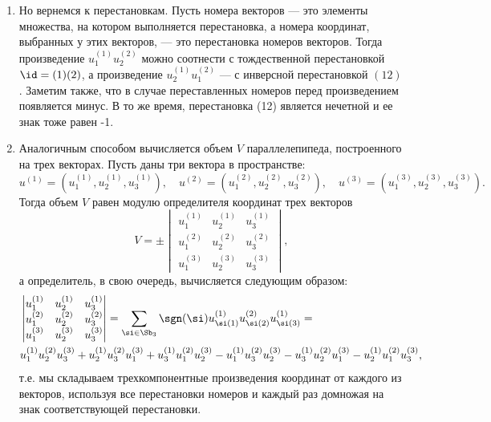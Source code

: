 \begin{enumerate}
\item Но вернемся к перестановкам. Пусть номера векторов --- это элементы множества, на котором выполняется перестановка, а номера координат, выбранных у этих векторов, --- это перестановка номеров векторов. Тогда произведение $u^{(1)}_1u^{(2)}_2$ можно соотнести с тождественной перестановкой $\id=(1)(2)$, а произведение $u^{(1)}_2u^{(2)}_1$ --- с инверсной перестановкой $(12)$. Заметим также, что в случае переставленных номеров перед произведением появляется минус. В то же время, перестановка (12) является нечетной и ее знак тоже равен -1.
\item Аналогичным способом вычисляется объем $V$ параллелепипеда, построенного на трех векторах. Пусть даны три вектора в пространстве:
$$
u^{(1)}=(u^{(1)}_1,u^{(1)}_2,u^{(1)}_3),\quad u^{(2)}=(u^{(2)}_1,u^{(2)}_2,u^{(2)}_3),\quad u^{(3)}=(u^{(3)}_1,u^{(3)}_2,u^{(3)}_3).
$$
Тогда объем $V$ равен модулю определителя координат трех векторов
$$
V=\pm\begin{vmatrix}
u^{(1)}_1 & u^{(1)}_2 & u^{(1)}_3 \\
u^{(2)}_1 & u^{(2)}_2 & u^{(2)}_3 \\
u^{(3)}_1 & u^{(3)}_2 & u^{(3)}_3 
\end{vmatrix},
$$
а определитель, в свою очередь, вычисляется следующим образом:
\begin{align*}
&
\begin{vmatrix}
u^{(1)}_1 & u^{(1)}_2 & u^{(1)}_3 \\
u^{(2)}_1 & u^{(2)}_2 & u^{(2)}_3 \\
u^{(3)}_1 & u^{(3)}_2 & u^{(3)}_3 
\end{vmatrix} = \sum_{\si\in\Sb_3} \sgn(\si) u^{(1)}_{\si(1)} u^{(2)}_{\si(2)} u^{(1)}_{\si(3)}= \\
& u^{(1)}_1 u^{(2)}_2 u^{(3)}_3 + u^{(1)}_2 u^{(2)}_3 u^{(3)}_1 +
u^{(1)}_3 u^{(2)}_1  u^{(3)}_2 - u^{(1)}_1 u^{(2)}_3  u^{(3)}_2 
 -u^{(1)}_3 u^{(2)}_2  u^{(3)}_1 -u^{(1)}_2 u^{(2)}_1 u^{(3)}_3,
\end{align*}
т.е. мы складываем трехкомпонентные произведения координат от каждого из векторов, используя все перестановки номеров и каждый раз домножая на знак соответствующей перестановки.


\end{enumerate}
